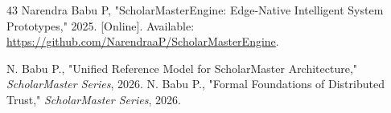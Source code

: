 \documentclass[conference]{IEEEtran}
\begin{document}
\begin{thebibliography}{43}
Narendra Babu P, "ScholarMasterEngine: Edge-Native Intelligent System Prototypes," 2025. [Online]. Available: \url{https://github.com/NarendraaP/ScholarMasterEngine}.


 N. Babu P., "Unified Reference Model for ScholarMaster Architecture," \textit{ScholarMaster Series}, 2026.
 N. Babu P., "Formal Foundations of Distributed Trust," \textit{ScholarMaster Series}, 2026.
\end{thebibliography}
\end{document}
